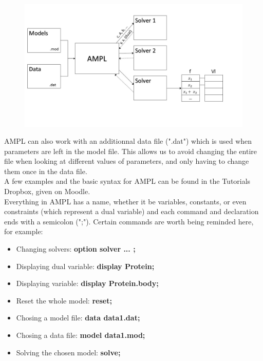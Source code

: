 \begin{figure}[h!]
\centering
\includegraphics[width=\textwidth]{./images/Course1_Slide2.JPG}
\caption{}
\label{Figure2}
\end{figure} 

AMPL can also work with an additionnal data file (".dat") which is used when parameters are left in the model file. This allows us to avoid changing the entire file when looking at different values of parameters, and only having to change them once in the data file. \\

A few examples and the basic syntax for AMPL can be found in the Tutorials Dropbox, given on Moodle. \\

Everything in AMPL has a name, whether it be variables, constants, or even constraints (which represent a dual variable) and each command and declaration ends with a semicolon (";"). 
Certain commands are worth being reminded here, for example: \\

\begin{itemize}
  \item Changing solvers: \textbf{option solver ... ;}
  \item Displaying dual variable: \textbf{display Protein;}
  \item Displaying variable: \textbf{display Protein.body;}
  \item Reset the whole model: \textbf{reset;}
  \item Chosing a model file: \textbf{data data1.dat;}
  \item Chosing a data file: \textbf{model data1.mod;}
  \item Solving the chosen model: \textbf{solve;}
\end{itemize} 



